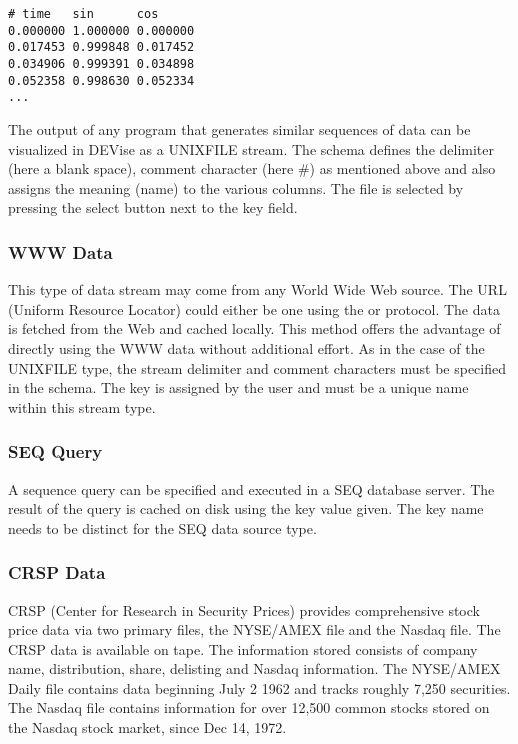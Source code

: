 \begin{verbatim}
# time   sin      cos
0.000000 1.000000 0.000000
0.017453 0.999848 0.017452
0.034906 0.999391 0.034898
0.052358 0.998630 0.052334
... 
\end{verbatim}

The output of any program that generates similar sequences of data can
be visualized in DEVise as a UNIXFILE stream. The schema defines the
delimiter (here a blank space), comment character (here \#) as
mentioned above and also assigns the meaning (name) to the various
columns. The file is selected by pressing the select button next to
the key field.

\subsubsection{WWW Data}

This type of data stream may come from any World Wide Web source. The
URL (Uniform Resource Locator) could either be one using the
 or  protocol. The data is fetched from the Web
and cached locally. This method offers the advantage of directly using
the WWW data without additional effort. As in the case of the UNIXFILE
type, the stream delimiter and comment characters must be specified in
the schema. The key is assigned by the user and must be a unique name
within this stream type.

\subsubsection{SEQ Query}

A sequence query can be specified and executed in a SEQ database
server.  The result of the query is cached on disk using the key value
given. The key name needs to be distinct for the SEQ data source type.

\subsubsection{CRSP Data}

CRSP (Center for Research in Security Prices) provides comprehensive
stock price data via two primary files, the NYSE/AMEX file and the
Nasdaq file. The CRSP data is available on tape. The information
stored consists of company name, distribution, share, delisting and
Nasdaq information. The NYSE/AMEX Daily file contains data beginning
July 2 1962 and tracks roughly 7,250 securities. The Nasdaq file
contains information for over 12,500 common stocks stored on the
Nasdaq stock market, since Dec 14, 1972.

